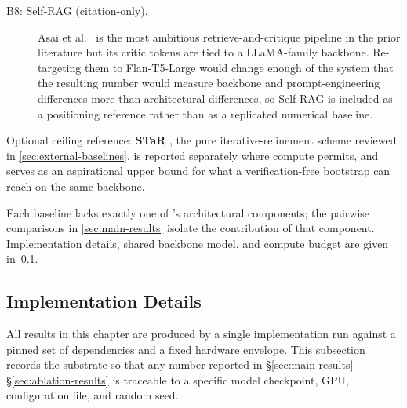 \begin{description}
  \item[B8: Self-RAG (citation-only).]
  Asai et al.~\cite{asai2024selfrag} is the most ambitious
  retrieve-and-critique pipeline in the prior literature but its
  critic tokens are tied to a LLaMA-family backbone. Re-targeting
  them to Flan-T5-Large would change enough of the system that the
  resulting number would measure backbone and prompt-engineering
  differences more than architectural differences, so Self-RAG is
  included as a positioning reference rather than as a replicated
  numerical baseline.
\end{description}

Optional ceiling reference: \textbf{STaR}
\cite{NEURIPS2022_639a9a17}, the pure iterative-refinement scheme
reviewed in \cref{sec:external-baselines}, is reported separately where
compute permits, and serves as an aspirational upper bound for what a
verification-free bootstrap can reach on the same backbone.

Each baseline lacks exactly one of \caem{}'s architectural components;
the pairwise comparisons in \cref{sec:main-results} isolate the
contribution of that component. Implementation details, shared backbone
model, and compute budget are given in~\cref{sec:impl-details}.

\subsection{Implementation Details}
\label{sec:impl-details}

All results in this chapter are produced by a single implementation
run against a pinned set of dependencies and a fixed hardware
envelope. This subsection records the substrate so that any number
reported in \S\ref{sec:main-results}--\S\ref{sec:ablation-results} is
traceable to a specific model checkpoint, GPU, configuration file,
and random seed.

